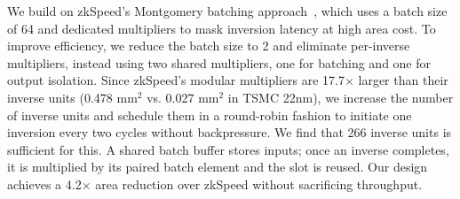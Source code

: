We build on zkSpeed’s Montgomery batching approach~\cite{Montgomery_1987}, which uses a batch size of 64 and dedicated multipliers to mask inversion latency at high area cost. To improve efficiency, we reduce the batch size to 2 and eliminate per-inverse multipliers, instead using two shared multipliers, one for batching and one for output isolation. Since zkSpeed's modular multipliers are 17.7$\times$ larger than their inverse units (0.478 mm$^2$ vs. 0.027 mm$^2$ in TSMC 22nm), we increase the number of inverse units and schedule them in a round-robin fashion to initiate one inversion every two cycles without backpressure. We find that 266 inverse units is sufficient for this. A shared batch buffer stores inputs; once an inverse completes, it is multiplied by its paired batch element and the slot is reused. Our design achieves a 4.2$\times$ area reduction over zkSpeed without sacrificing throughput.

